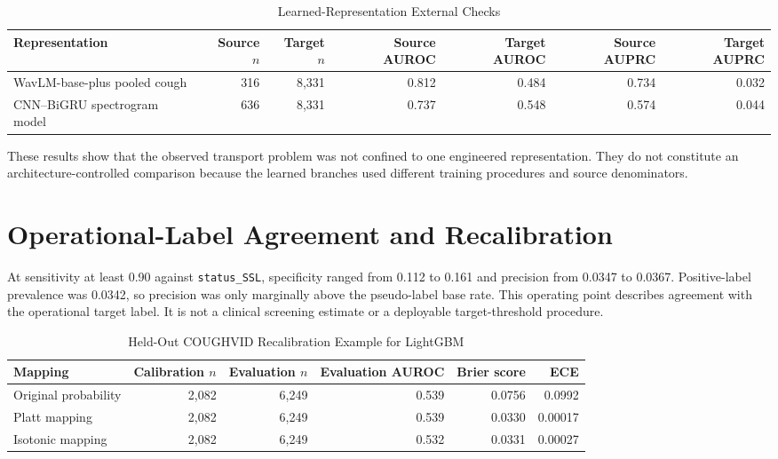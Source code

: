 \documentclass[journal]{IEEEtran}
\begin{document}
\begin{table}[t]
\vspace{4pt}
\caption{Learned-Representation External Checks}
\label{tab:s_deep}
\centering
\footnotesize
\begin{tabular}{lrrrrrr}
\toprule
Representation & Source $n$ & Target $n$ & Source AUROC & Target AUROC & Source AUPRC & Target AUPRC \\
\midrule
WavLM-base-plus pooled cough & 316 & 8,331 & 0.812 & 0.484 & 0.734 & 0.032 \\
CNN--BiGRU spectrogram model & 636 & 8,331 & 0.737 & 0.548 & 0.574 & 0.044 \\
\bottomrule
\end{tabular}
\end{table}

These results show that the observed transport problem was not confined to one engineered representation. They do not constitute an architecture-controlled comparison because the learned branches used different training procedures and source denominators.

\section{Operational-Label Agreement and Recalibration}

At sensitivity at least 0.90 against \texttt{status\_SSL}, specificity ranged from 0.112 to 0.161 and precision from 0.0347 to 0.0367. Positive-label prevalence was 0.0342, so precision was only marginally above the pseudo-label base rate. This operating point describes agreement with the operational target label. It is not a clinical screening estimate or a deployable target-threshold procedure.

\begin{table}[t]
\caption{Held-Out COUGHVID Recalibration Example for LightGBM}
\label{tab:s_recalibration}
\centering
\footnotesize
\begin{tabular}{lrrrrr}
\toprule
Mapping & Calibration $n$ & Evaluation $n$ & Evaluation AUROC & Brier score & ECE \\
\midrule
Original probability & 2,082 & 6,249 & 0.539 & 0.0756 & 0.0992 \\
Platt mapping & 2,082 & 6,249 & 0.539 & 0.0330 & 0.00017 \\
Isotonic mapping & 2,082 & 6,249 & 0.532 & 0.0331 & 0.00027 \\
\bottomrule
\end{tabular}
\end{table}
\end{document}
